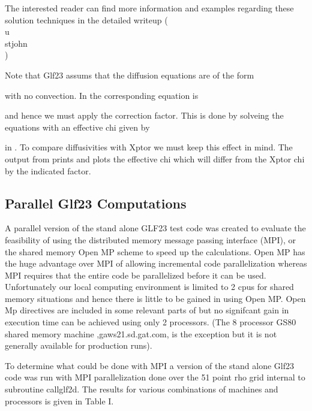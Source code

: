 \documentclass[12pt]{article}
\begin{document}
      The interested reader
      can find more information and examples 
      regarding these solution techniques in
      the detailed \ot writeup (\\u\\stjohn\\)
     
      Note that Glf23 assums that the diffusion equations are of the
      form

      with no convection. In \ot the corresponding equation is


      and hence we must apply the correction factor. This is done
      by solveing the equations with an effective chi given by

     in \ot. To compare diffusivities with Xptor we must keep
     this effect in mind. The output from \ot prints and plots the
     effective chi which will differ from the Xptor chi by the
     indicated factor.

\subsection{Parallel Glf23  Computations}
     A parallel version of the stand alone GLF23 test code was
     created to evaluate  the feasibility of using the distributed
     memory   message passing
     interface (MPI), or the shared memory Open MP scheme
     to speed up the calculations.
      Open MP has the huge  advantage over MPI of allowing
     incremental code parallelization  whereas MPI  requires that the
     entire code be parallelized before it can be used.
      Unfortunately our local computing
     environment is limited to 2 cpus for shared memory situations and hence 
    there is little to be gained in using Open MP. 
      Open Mp directives are   included in
    some relevant parts of \ot but no signifcant gain in execution
    time can be achieved using only 2 processors. (The 8 processor GS80
    shared memory machine ,gaws21.sd.gat.com, is the exception but
   it is not generally available for production \ot runs).

   To determine what could be done with MPI a 
   version of the stand alone Glf23 code was run with MPI 
  parallelization done  over the 51 point rho grid internal to
  subroutine callglf2d. The results for various combinations of
  machines and  processors is given in Table I.
    
\end{document}
